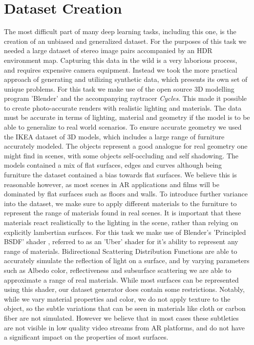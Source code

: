 \documentclass[ %
                    author={Gavin Parker},
                supervisor={Dr. Neill Campbell},
                    degree={MEng},
                     title={Deep Siamese Networks for Illumination Estimation from Stereo Images},
                  subtitle={},
                      type={Research},
                      year={2018} ]{dissertation}
\begin{document}
\section{Dataset Creation}
The most difficult part of many deep learning tasks, including this one, is the creation of an unbiased and generalized dataset. For the purposes of this task we needed a large dataset of stereo image pairs accompanied by an HDR environment map. Capturing this data in the wild is a very laborious process, and requires expensive camera equipment. Instead we took the more practical approach of generating and utilizing synthetic data, which presents its own set of unique problems. For this task we make use of the open source 3D modelling program 'Blender' and the accompanying raytracer \textit{Cycles}. This made it possible to create photo-accurate renders with realistic lighting and materials. The data must be accurate in terms of lighting, material and geometry if the model is to be able to generalize to real world scenarios. To ensure accurate geometry we used the IKEA dataset \cite{lpt2013ikea} of 3D models, which includes a large range of furniture accurately modeled. The objects represent a good analogue for real geometry one might find in scenes, with some objects self-occluding and self shadowing. The models contained a mix of flat surfaces, edges and curves although being furniture the dataset contained a bias towards flat surfaces. We believe this is reasonable however, as most scenes in AR applications and films will be dominated by flat surfaces such as floors and walls.
\newline
To introduce further variance into the dataset, we make sure to apply different materials to the furniture to represent the range of materials found in real scenes. It is important that these materials react realistically to the lighting in the scene, rather than relying on explicitly lambertian surfaces. For this task we make use of Blender's 'Principled BSDF' shader \cite{principled_BSDF}, referred to as an 'Uber' shader for it's ability to represent any range of materials. Bidirectional Scattering Distribution Functions are able to accurately simulate the reflection of light on a surface, and by varying parameters such as Albedo color, reflectiveness and subsurface scattering we are able to approximate a range of real materials. While most surfaces can be represented using this shader, our dataset generator does contain some restrictions. Notably, while we vary material properties and color, we do not apply texture to the object, so the subtle variations that can be seen in materials like cloth or carbon fiber are not simulated. However we believe that in most cases these subtleties are not visible in low quality video streams from AR platforms, and do not have a significant impact on the properties of most surfaces.
\end{document}
